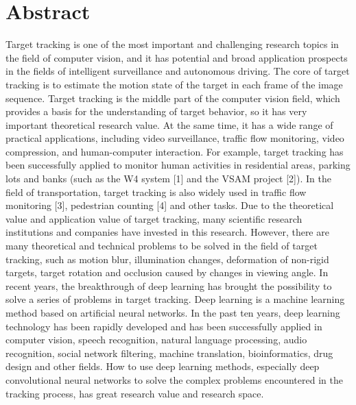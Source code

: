 
\intobmk\chapter*{Abstract}%

Target tracking is one of the most important and challenging research topics in the field of computer vision, and it has potential and broad application prospects in the fields of intelligent surveillance and autonomous driving. The core of target tracking is to estimate the motion state of the target in each frame of the image sequence. Target tracking is the middle part of the computer vision field, which provides a basis for the understanding of target behavior, so it has very important theoretical research value. At the same time, it has a wide range of practical applications, including video surveillance, traffic flow monitoring, video compression, and human-computer interaction. For example, target tracking has been successfully applied to monitor human activities in residential areas, parking lots and banks (such as the W4 system [1] and the VSAM project [2]). In the field of transportation, target tracking is also widely used in traffic flow monitoring [3], pedestrian counting [4] and other tasks.
Due to the theoretical value and application value of target tracking, many scientific research institutions and companies have invested in this research. However, there are many theoretical and technical problems to be solved in the field of target tracking, such as motion blur, illumination changes, deformation of non-rigid targets, target rotation and occlusion caused by changes in viewing angle. In recent years, the breakthrough of deep learning has brought the possibility to solve a series of problems in target tracking.
Deep learning is a machine learning method based on artificial neural networks. In the past ten years, deep learning technology has been rapidly developed and has been successfully applied in computer vision, speech recognition, natural language processing, audio recognition, social network filtering, machine translation, bioinformatics, drug design and other fields. How to use deep learning methods, especially deep convolutional neural networks to solve the complex problems encountered in the tracking process, has great research value and research space.


